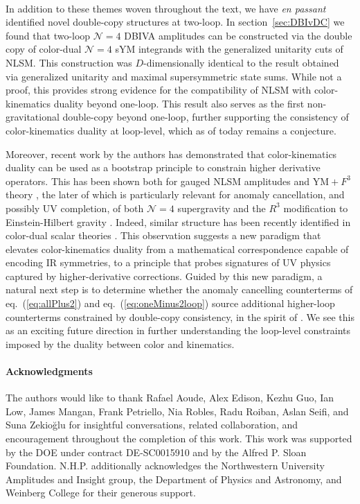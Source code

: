 \documentclass[12pt,letter]{article}
\def\sect#1{section~\ref{#1}}
\def\eqn#1{eq.~(\ref{#1})}
\begin{document}
\paragraph{} In addition to these themes woven throughout the text, we have \textit{en passant} identified novel double-copy structures at two-loop. In \sect{sec:DBIvDC} we found that two-loop $\mathcal{N}=4$ DBIVA amplitudes can be constructed via the double copy of color-dual $\mathcal{N}=4$ sYM integrands with the generalized unitarity cuts of NLSM. This construction was $D$-dimensionally identical to the result obtained via generalized unitarity and maximal supersymmetric state sums. While not a proof, this provides strong evidence for the compatibility of NLSM with color-kinematics duality beyond one-loop. This result also serves as the first non-gravitational double-copy beyond one-loop, further supporting the consistency of color-kinematics duality at loop-level, which as of today remains a conjecture. 


Moreover, recent work by the authors has demonstrated that color-kinematics duality can be used as a bootstrap principle to constrain higher derivative operators. This has been shown both for gauged NLSM amplitudes \cite{Carrasco:2022sck} and $\text{YM}+F^3$ theory \cite{Carrasco:2022lbm}, the later of which is particularly relevant for anomaly cancellation, and possibly UV completion, of both $\mathcal{N}=4$ supergravity and the $R^3$ modification to Einstein-Hilbert gravity \cite{Carrasco:2022lbm}. Indeed, similar structure has been recently identified in color-dual scalar theories \cite{Chen:2022shl,Chen:2023dcx,Brown:2023srz}. This observation suggests a new paradigm that elevates color-kinematics duality from a mathematical correspondence capable of encoding IR symmetries, to a principle that probes signatures of UV physics captured by higher-derivative corrections. Guided by this new paradigm, a natural next step is to determine whether the anomaly cancelling counterterms of \eqn{eq:allPlus2} and \eqn{eq:oneMinus2loop} source additional higher-loop counterterms constrained by double-copy consistency, in the spirit of \cite{Carrasco:2022lbm}. We see this as an exciting future direction in further understanding the loop-level constraints imposed by the duality between color and kinematics.  


\paragraph{Acknowledgments} The authors would like to thank Rafael Aoude, Alex Edison, Kezhu Guo, Ian Low, James Mangan, Frank Petriello, Nia Robles, Radu Roiban, Aslan Seifi, and Suna Zekio\u{g}lu for insightful conversations, related collaboration, and encouragement throughout the completion of this work. This work was supported by the DOE under contract DE-SC0015910 and by the Alfred P. Sloan Foundation. N.H.P. additionally acknowledges the Northwestern University Amplitudes and Insight group, the Department of Physics and Astronomy, and Weinberg College for their generous support. 



\end{document}
